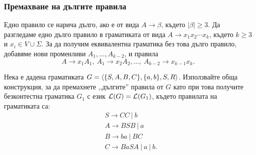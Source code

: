 \subsubsection*{Премахване на дългите правила}

Едно правило се нарича дълго, ако е от вида $A \to \beta$, където $|\beta| \geq 3$.
Да разгледаме едно дълго правило в граматиката от вида $A \to x_1x_2\cdots x_k$, 
където $k \geq 3$ и $x_i \in V \cup \Sigma$. За да получим еквивалентна граматика без това дълго правило,
добавяме нови променливи $A_1,\dots, A_{k-2}$, и правила
\[A \to x_1A_1,\ A_1 \to x_2A_2, \dots,\ A_{k-2} \to x_{k-1}x_k.\]


\begin{problem}
  Нека е дадена граматиката  $G = \langle{\{S,A,B,C\}, \{a,b\}, S, R}\rangle$.
  Използвайте обща конструкция, за да премахнете ,,дългите'' правила от $ G$ като при това получите 
  безконтестна граматика $G_1$ с език $\mathcal{L}(G) = \mathcal{L}(G_1)$, където правилата на граматиката са:
    \begin{align*}
      & S\to CC\ |\ b\\
      & A\to BSB\ |\ a\\
      & B\to ba\ |\ BC\\
      & C\to BaSA\ |\ a\ |\ b.
    \end{align*}
\end{problem}

